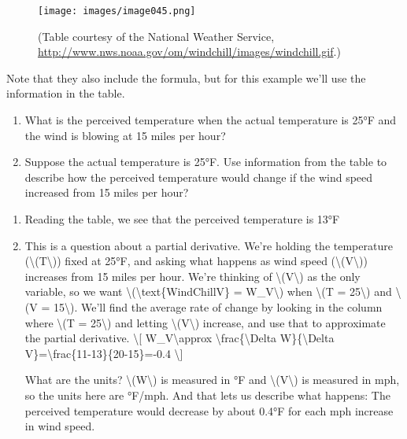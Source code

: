 \begin{figure}
\centering
\texttt{[image: images/image045.png]}
\caption{(Table courtesy of the National Weather Service,
\url{http://www.nws.noaa.gov/om/windchill/images/windchill.gif}.)}
\end{figure}

Note that they also include the formula, but for this example we'll use
the information in the table.

\begin{enumerate}
\tightlist
\item
  What is the perceived temperature when the actual temperature is 25°F
  and the wind is blowing at 15 miles per hour?
\item
  Suppose the actual temperature is 25°F. Use information from the table
  to describe how the perceived temperature would change if the wind
  speed increased from 15 miles per hour?
\end{enumerate}

\begin{enumerate}
\item
  Reading the table, we see that the perceived temperature is 13°F
\item
  This is a question about a partial derivative. We're holding the
  temperature (\textbackslash{}(T\textbackslash{})) fixed at 25°F, and
  asking what happens as wind speed
  (\textbackslash{}(V\textbackslash{})) increases from 15 miles per
  hour. We're thinking of \textbackslash{}(V\textbackslash{}) as the
  only variable, so we want
  \textbackslash{}(\textbackslash{}text\{WindChillV\} =
  W\_V\textbackslash{}) when \textbackslash{}(T = 25\textbackslash{})
  and \textbackslash{}(V = 15\textbackslash{}). We'll find the average
  rate of change by looking in the column where \textbackslash{}(T =
  25\textbackslash{}) and letting \textbackslash{}(V\textbackslash{})
  increase, and use that to approximate the partial derivative.
  \textbackslash{}{[} W\_V\textbackslash{}approx
  \textbackslash{}frac\{\textbackslash{}Delta W\}\{\textbackslash{}Delta
  V\}=\textbackslash{}frac\{11-13\}\{20-15\}=-0.4 \textbackslash{}{]}

  What are the units? \textbackslash{}(W\textbackslash{}) is measured in
  °F and \textbackslash{}(V\textbackslash{}) is measured in mph, so the
  units here are °F/mph. And that lets us describe what happens: The
  perceived temperature would decrease by about 0.4°F for each mph
  increase in wind speed.
\end{enumerate}

